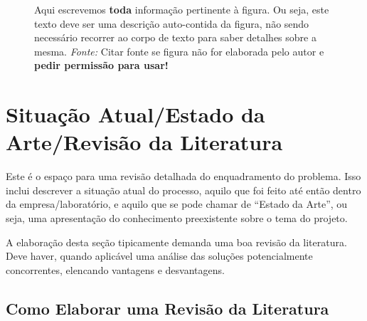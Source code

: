 \begin{figure}[thpb]
  \centering
  \caption{Aqui escrevemos \textbf{toda} informação pertinente à figura. Ou seja, este texto deve ser uma descrição auto-contida da figura, não sendo necessário recorrer ao corpo de texto para saber detalhes sobre a mesma. \emph{Fonte:} Citar fonte se figura 	não for elaborada pelo autor e \textbf{pedir permissão para usar!}}
  \label{fig:processo}
\end{figure}


\section{Situação Atual/Estado da Arte/Revisão da Literatura}
\label{sec:revisão}

Este é o espaço para uma revisão detalhada do enquadramento do problema. Isso inclui descrever a situação atual do processo, aquilo que foi feito até então dentro da empresa/laboratório, e aquilo que se pode chamar de ``Estado da Arte'', ou seja, uma apresentação do conhecimento preexistente
sobre o tema do projeto.

A elaboração desta seção tipicamente demanda uma boa revisão da literatura. Deve haver, quando aplicável uma análise das soluções potencialmente concorrentes, elencando vantagens e desvantagens.

\subsection{Como Elaborar uma Revisão da Literatura}

